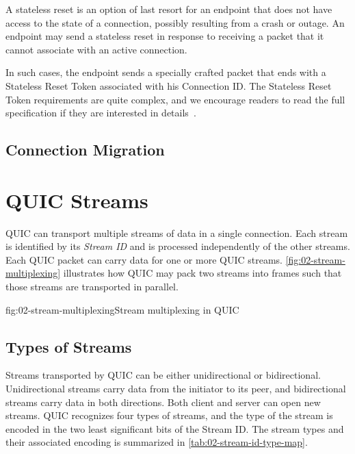 A stateless reset is an option of last resort for an endpoint that does not have access to the state
of a connection, possibly resulting from a crash or outage. An endpoint may send a stateless reset
in response to receiving a packet that it cannot associate with an active connection.

In such cases, the endpoint sends a specially crafted packet that ends with a Stateless Reset Token
associated with his Connection ID\@. The Stateless Reset Token requirements are quite complex, and
we encourage readers to read the full specification if they are interested in details~\cite[Section~10.4]{draft-ietf-quic-transport}.

\subsection{Connection Migration}


\section{QUIC Streams}

QUIC can transport multiple streams of data in a single connection. Each stream is identified by its
\textit{Stream ID} and is processed independently of the other streams. Each QUIC packet can carry
data for one or more QUIC streams. \autoref{fig:02-stream-multiplexing} illustrates how QUIC may
pack two streams into frames such that those streams are transported in parallel.

\begin{myFigure}{fig:02-stream-multiplexing}{Stream multiplexing in QUIC}

  

\end{myFigure}

\subsection{Types of Streams}

Streams transported by QUIC can be either unidirectional or bidirectional. Unidirectional streams
carry data from the initiator to its peer, and bidirectional streams carry data in both directions.
Both client and server can open new streams. QUIC recognizes four types of streams, and the type of
the stream is encoded in the two least significant bits of the Stream ID. The stream types and their
associated encoding is summarized in \autoref{tab:02-stream-id-type-map}.

